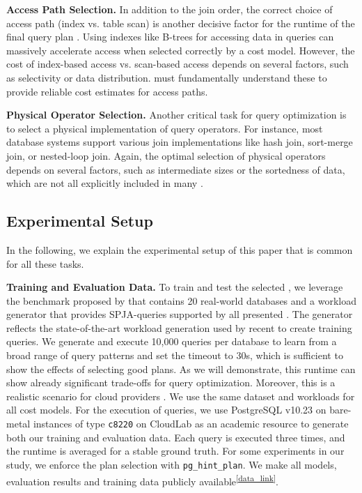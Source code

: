 \noindent\textbf{Access Path Selection.}
In addition to the join order, the correct choice of access path (index vs. table scan) is another decisive factor for the runtime of the final query plan \cite{selinger1979}. 
Using indexes like B-trees for accessing data in queries can massively accelerate access when selected correctly by a cost model.
However, the cost of index-based access vs. scan-based access depends on several factors, such as selectivity or data distribution.
\lcms must fundamentally understand these to provide reliable cost estimates for access paths.

\noindent\textbf{Physical Operator Selection.}
Another critical task for query optimization is to select a physical implementation of query operators.
For instance, most database systems support various join implementations like hash join, sort-merge join, or nested-loop join.
Again, the optimal selection of physical operators depends on several factors, such as intermediate sizes or the sortedness of data, which are not all explicitly included in many \lcms.
 
\subsection{Experimental Setup} \label{subsec:setup}
In the following, we explain the experimental setup of this paper that is common for all these tasks.

\noindent\textbf{Training and Evaluation Data.}
To train and test the selected \lcms, we leverage the benchmark proposed by \cite{hilprecht2022} that contains 20 real-world databases and a workload generator that provides SPJA-queries supported by all presented \lcms.
The generator reflects the state-of-the-art workload generation used by recent \lcms to create training queries.
We generate and execute 10,000 queries per database to learn from a broad range of query patterns and set the timeout to 30s, which is sufficient to show the effects of selecting good plans.
As we will demonstrate, this runtime can show already significant trade-offs for query optimization.
Moreover, this is a realistic scenario for cloud providers \cite{renen2023, renen2024}.
We use the same dataset and workloads for all cost models. 
For the execution of queries, we use PostgreSQL v10.23 on bare-metal instances of type \texttt{c8220} on CloudLab as an academic resource \cite{duplyakin2019} to generate both our training and evaluation data.
Each query is executed three times, and the runtime is averaged for a stable ground truth.
For some experiments in our study, we enforce the plan selection with \texttt{pg\_hint\_plan}.
We make all models, evaluation results and training data publicly available\textsuperscript{\ref{data_link}}.

